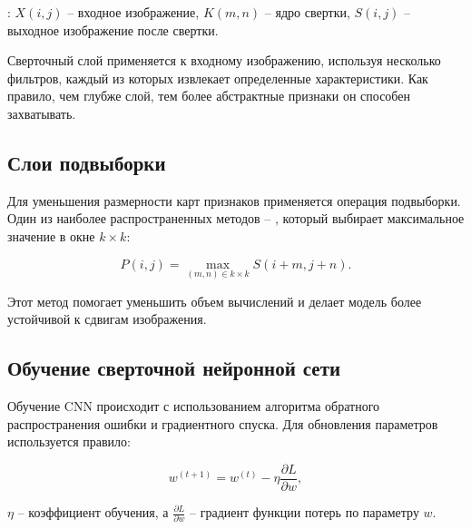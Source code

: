 :
    \( X(i, j) \) – входное изображение,
    \( K(m, n) \) – ядро свертки,
    \( S(i, j) \) – выходное изображение после свертки.

Сверточный слой применяется к входному изображению, используя несколько 
фильтров, каждый из которых извлекает определенные характеристики. Как правило,
чем глубже слой, тем более абстрактные признаки он способен захватывать.

\subsection{Слои подвыборки}
\hspace*{12.5 mm}Для уменьшения размерности карт признаков применяется операция 
подвыборки. Один из наиболее распространенных методов – , 
который выбирает максимальное значение в окне \( k \times k \):

\begin{equation}
    P(i, j) = \max_{(m, n) \in k \times k} S(i+m, j+n).
\end{equation}

Этот метод помогает уменьшить объем вычислений и делает модель более устойчивой
к сдвигам изображения.

\subsection{Обучение сверточной нейронной сети}
\hspace*{12.5 mm}Обучение CNN происходит с использованием алгоритма обратного 
распространения ошибки и градиентного спуска. Для обновления параметров 
используется правило:

\begin{equation}
    w^{(t+1)} = w^{(t)} - \eta \frac{\partial L}{\partial w},
\end{equation}

 \( \eta \) – коэффициент обучения, а \( \frac{\partial L}{\partial w} \) – 
градиент функции потерь по параметру \( w \).

